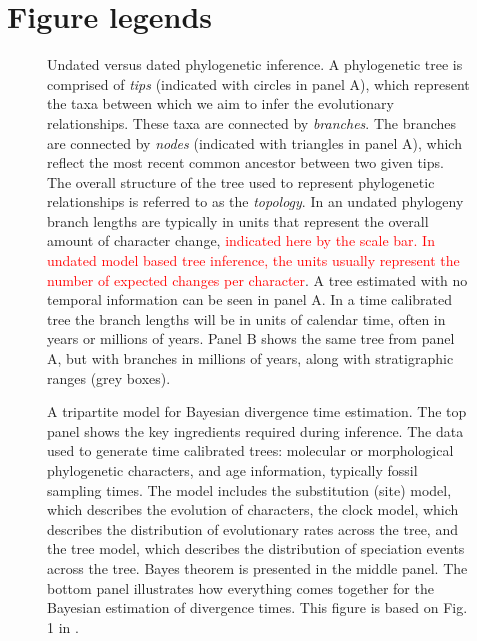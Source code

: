 \documentclass{cup-elements}
\newcommand{\rev}[1]{{\textcolor{red}{#1}}} %
\begin{document}
\clearpage

\section*{Figure legends}

\begin{figure}[h!]
\centering
\label{fig:undated}
\caption{Undated versus dated phylogenetic inference.
A phylogenetic tree is comprised of \textit{tips} (indicated with circles in panel A), which represent the taxa between which we aim to infer the evolutionary relationships.
These taxa are connected by \textit{branches}. 
The branches are connected by \textit{nodes} (indicated with triangles in panel A), which reflect the most recent common ancestor between two given tips. 
The overall structure of the tree used to represent phylogenetic relationships is referred to as the \textit{topology}.
In an undated phylogeny branch lengths are typically in units that represent the overall amount of character change, \rev{indicated here by the scale bar. In undated model based tree inference, the units usually represent the number of expected changes per character}.
A tree estimated with no temporal information can be seen in panel A.
In a time calibrated tree the branch lengths will be in units of calendar time, often in years or millions of years. 
Panel B shows the same tree from panel A, but with branches in millions of years, along with stratigraphic ranges (grey boxes).}
\label{fig:undated}
\end{figure}

\begin{figure}[h!]
\centering
\caption{A tripartite model for Bayesian divergence time estimation.
The top panel shows the key ingredients required during inference.
The data used to generate time calibrated trees: molecular or morphological phylogenetic characters, and age information, typically fossil sampling times.
The model includes the substitution (site) model, which describes the evolution of characters, the clock model, which describes the distribution of evolutionary rates across the tree, and the tree model, which describes the distribution of speciation events across the tree.
Bayes theorem is presented in the middle panel. 
The bottom panel illustrates how everything comes together for the Bayesian estimation of divergence times.
This figure is based on Fig. 1 in \citep{duPlessis2015}.
}
\label{fig:bayes}
\end{figure}
\end{document}
